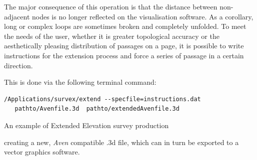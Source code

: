 The major consequence of this operation is that the distance between non-adjacent nodes is no longer reflected on the visualisation software. As a corollary, long or complex loops are sometimes broken and completely unfolded. To meet the needs of the user, whether it is greater topological accuracy or the aesthetically pleasing distribution of passages on a page, it is possible to write instructions for the extension process and force a series of passage in a certain direction.

 

This is done via the following terminal command:
\begin{verbatim}
/Applications/survex/extend --specfile=instructions.dat 
   pathto/Avenfile.3d  pathto/extendedAvenfile.3d
\end{verbatim}

\begin{marginsurvey}
\caption{An example of Extended Elevation survey production} \label{fig:example}
\end{marginsurvey}

creating a new, \emph{Aven} compatible .3d file, which can in turn be exported to a vector graphics software.

